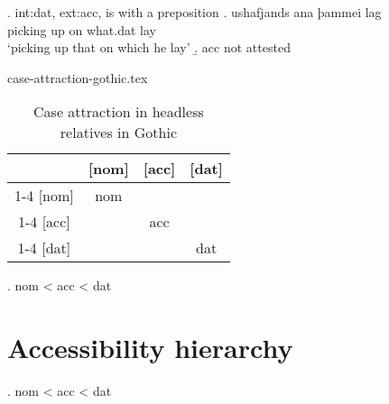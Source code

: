\ex. \ac{int}:\ac{dat}, \ac{ext}:\ac{acc}, is with a preposition
\ag. ushafjands ana þammei lag\\
 {picking up}\scsub{[acc]}\scsub{[dat]} on what.\ac{dat} lay\\
 `picking up that on which he lay' 
\b. \ac{acc} not attested

\begin{filecontents}{case-attraction-gothic.tex}
\begin{table}[h]
  \center
  \caption {Case attraction in headless relatives in Gothic}
    \begin{tabular}{c|c|c|c}
      \toprule
        \diagbox[linecolor=white]{\ac{int}}{\ac{ext}}
            & [\ac{nom}]
            & [\ac{acc}]
            & [\ac{dat}]
            \\ \cmidrule{1-4}
        [\ac{nom}]
            & \colorbox{LG}{\ac{nom}}
            & \diagbox[linecolor=white]{?\ac{nom}}{\colorbox{DG}{\ac{acc}}}
            & \diagbox[linecolor=white]{?\ac{nom}}{\colorbox{DG}{\ac{dat}}}
            \\ \cmidrule{1-4}
        [\ac{acc}]
            & \diagbox[linecolor=white]{\colorbox{DG}{\ac{acc}}}{?\ac{nom}}
            &	\colorbox{LG}{\ac{acc}}
            &	\diagbox[linecolor=white]{?\ac{acc}}{\colorbox{DG}{\ac{dat}}}
            \\ \cmidrule{1-4}
        [\ac{dat}]
            & \diagbox[linecolor=white]{\colorbox{DG}{\ac{dat}}}{?\ac{nom}}
            &	\diagbox[linecolor=white]{\colorbox{DG}{\ac{dat}}}{?\ac{acc}}
            & \colorbox{LG}{\ac{dat}}
            \\
      \bottomrule
    \end{tabular}
\end{table}
\end{filecontents}



\ex. \ac{nom} < \ac{acc} < \ac{dat}

\phantom{x}



\section{Accessibility hierarchy}

\ex. \ac{nom} < \ac{acc} < \ac{dat}

\phantom{x}




